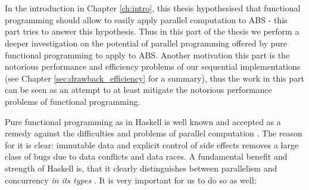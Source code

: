 \chapter*{} %
\label{ch:parallel_abs}
In the introduction in Chapter \ref{ch:intro}, this thesis hypothesised that functional programming should allow to easily apply parallel computation to ABS - this part tries to answer this hypothesis. Thus in this part of the thesis we perform a deeper investigation on the potential of parallel programming offered by pure functional programming to apply to ABS. Another motivation this part is the notorious performance and efficiency problems of our sequential implementations (see Chapter \ref{sec:drawback_efficiency} for a summary), thus the work in this part can be seen as an attempt to at least mitigate the notorious performance problems of functional programming.

Pure functional programming as in Haskell is well known and accepted as a remedy against the difficulties and problems of parallel computation \cite{hudak_history_2007}. The reason for it is clear: immutable data and explicit control of side effects removes a large class of bugs due to data conflicts and data races. A fundamental benefit and strength of Haskell is, that it clearly distinguishes between parallelism and concurrency \textit{in its types} \cite{jones_tackling_2002}. It is very important for us to do so as well:

